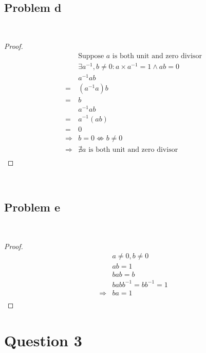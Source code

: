 \documentclass{article}
\begin{document}
~

\subsection*{Problem d}

~

\begin{proof}
    \begin{align*}
        &\text{Suppose }a\text{ is both unit and zero divisor}\\
        &\exists a^{-1},b\ne0:a\times a^{-1}=1\land ab=0\\
        &a^{-1}ab\\
        =&(a^{-1}a)b\\
        =&b\\
        &a^{-1}ab\\
        =&a^{-1}(ab)\\
        =&0\\
        \Rightarrow&b=0\nLeftrightarrow b\ne0\\
        \Rightarrow&\nexists a\text{ is both unit and zero divisor}\\
    \end{align*}
\end{proof}

~

\subsection*{Problem e}

~

\begin{proof}
    \begin{align*}
        &a\ne 0,b\ne 0\\
        &ab=1\\
        &bab=b\\
        &babb^{-1}=bb^{-1}=1\\
        \Rightarrow&ba=1\\
    \end{align*}
\end{proof}

\newpage

\section*{Question 3}

~
\end{document}

